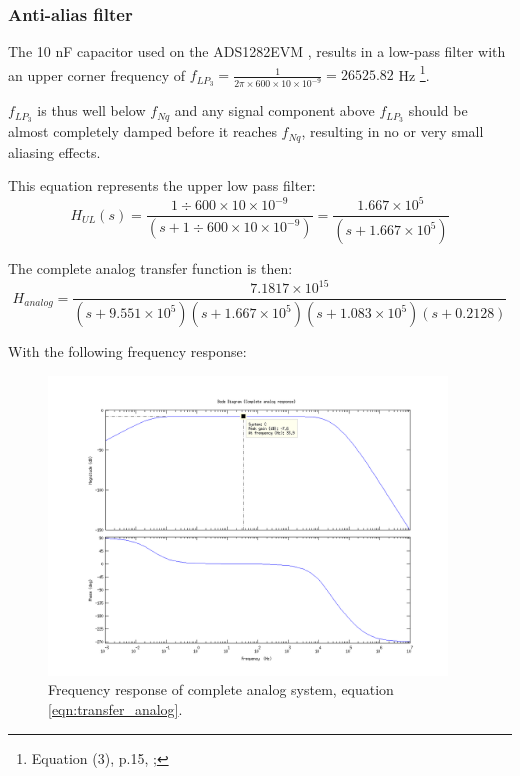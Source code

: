 \documentclass[a4paper]{article}
\begin{document}
\subsubsection{Anti-alias filter}
The 10 nF capacitor used on the ADS1282EVM
\cite{ads1282evm_ds}, results in a low-pass filter with an upper corner frequency of $f_{LP_3} =
\frac{1}{2 \pi \times 600 \times 10 \times 10^{-9}} = 26525.82 $ Hz
\footnote{Equation (3), p.15, \cite{ads1282_ds}; }.

$f_{LP_3}$ is thus well below $f_{Nq}$ and any signal component above $f_{LP_3}$ should
be almost completely damped before it reaches $f_{Nq}$, resulting in no
or very small aliasing effects.

This equation represents the upper low pass filter:
\begin{equation}
  H_{UL}(s) = \frac{1 \div 600 \times 10 \times 10^{-9}}
                   {(s + 1 \div 600 \times 10 \times 10^{-9})}
            = \frac{1.667 \times 10^5}{(s + 1.667 \times 10^5)}
  \label{eqn:transfer_upper_lowpass}
\end{equation}

The complete analog transfer function is then:
\begin{equation}
  H_{analog} = \frac{7.1817 \times 10^15}
                { (s + 9.551 \times 10^5)
                  (s + 1.667 \times 10^5)
                  (s + 1.083 \times 10^5)
                  (s + 0.2128) }
  \label{eqn:transfer_analog}
\end{equation}

With the following frequency response:
\begin{figure}[h!]
  \begin{center}
    \includegraphics[width=400px]{bode_complete_analog.png}
  \end{center}
  \caption{Frequency response of complete analog system, equation
    \eqref{eqn:transfer_analog}.}
  \label{fig:bode_complete_analog}
\end{figure}
\end{document}
